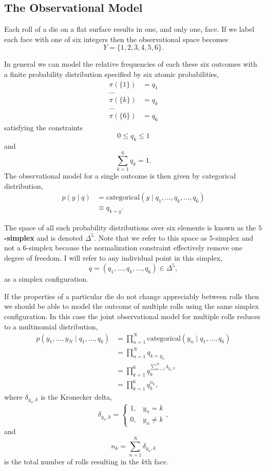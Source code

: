 \documentclass[
  letterpaper,
  DIV=11,
  numbers=noendperiod]{scrartcl}
\begin{document}
\subsection{The Observational Model}\label{the-observational-model}

Each roll of a die on a flat surface results in one, and only one, face.
If we label each face with one of six integers then the observational
space becomes \[
Y = \{ 1, 2, 3, 4, 5, 6 \}.
\]

In general we can model the relative frequencies of each these six
outcomes with a finite probability distribution specified by six atomic
probabilities, \begin{align*}
\pi( \{ 1 \} ) &= q_{1}
\\
\ldots&
\\
\pi( \{ k \} ) &= q_{k}
\\
\ldots&
\\
\pi( \{ 6 \} ) &= q_{6}
\end{align*} satisfying the constraints \[
0 \le q_{k} \le 1
\] and \[
\sum_{k = 1}^{6} q_{k} = 1.
\] The observational model for a single outcome is then given by
categorical distribution, \begin{align*}
p(y \mid q)
&=
\text{categorical}(y \mid q_{1}, \ldots, q_{k}, \ldots, q_{6})
\\
&\equiv
q_{k = y}.
\end{align*}

The space of all such probability distributions over six elements is
known as the \textbf{\(5\)-simplex} and is denoted \(\Delta^{5}\). Note
that we refer to this space as \(5\)-simplex and not a \(6\)-simplex
because the normalization constraint effectively remove one degree of
freedom. I will refer to any individual point in this simplex, \[
q = (q_{1}, \ldots, q_{k}, \ldots, q_{6}) \in \Delta^{5},
\] as a simplex configuration.

If the properties of a particular die do not change appreciably between
rolls then we should be able to model the outcome of multiple rolls
using the same simplex configuration. In this case the joint
observational model for multiple rolls reduces to a multinomial
distribution, \begin{align*}
p(y_{1}, \ldots, y_{N} \mid q_{1}, \ldots, q_{6})
&=
\prod_{n = 1}^{N}
\text{categorical}(y_{n} \mid q_{1}, \ldots, q_{6})
\\
&=
\prod_{n = 1}^{N} q_{k = y_{n}}
\\
&=
\prod_{k = 1}^{6}
q_{k}^{ \sum_{n = 1}^{N} \delta_{y_{n}, k} }
\\
&=
\prod_{k = 1}^{6} q_{k}^{ n_{k} },
\end{align*} where \(\delta_{y_{n}, k}\) is the Kronecker delta, \[
\delta_{y_{n}, k}
=
\left\{
\begin{array}{rr}
1, & y_{n} = k \\
0, & y_{n} \neq k
\end{array}
\right. ,
\] and \[
n_{k} = \sum_{n = 1}^{N} \delta_{y_{n}, k}
\] is the total number of rolls resulting in the \(k\)th face.
\end{document}
